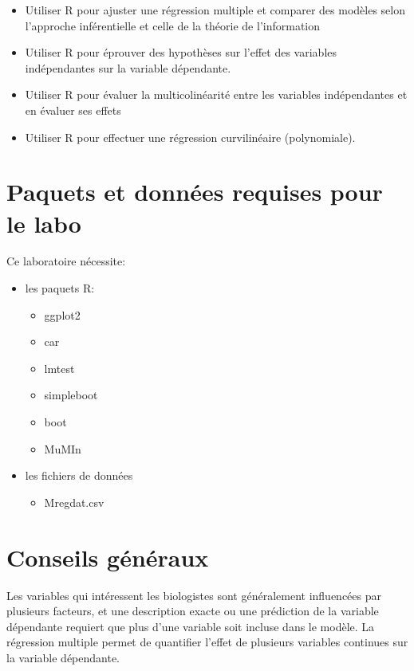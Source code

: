 \documentclass[
  12pt,
]{book}
\providecommand{\tightlist}{%
  \setlength{\itemsep}{0pt}\setlength{\parskip}{0pt}}
\begin{document}
\begin{itemize}
\tightlist
\item
  Utiliser R pour ajuster une régression multiple et comparer des modèles selon l'approche inférentielle et celle de la théorie de l'information
\item
  Utiliser R pour éprouver des hypothèses sur l'effet des variables indépendantes sur la variable dépendante.
\item
  Utiliser R pour évaluer la multicolinéarité entre les variables indépendantes et en évaluer ses effets
\item
  Utiliser R pour effectuer une régression curvilinéaire (polynomiale).
\end{itemize}

\hypertarget{set-reg-mul}{%
\section{Paquets et données requises pour le labo}\label{set-reg-mul}}

Ce laboratoire nécessite:

\begin{itemize}
\tightlist
\item
  les paquets R:

  \begin{itemize}
  \tightlist
  \item
    ggplot2
  \item
    car
  \item
    lmtest
  \item
    simpleboot
  \item
    boot
  \item
    MuMIn
  \end{itemize}
\item
  les fichiers de données

  \begin{itemize}
  \tightlist
  \item
    Mregdat.csv
  \end{itemize}
\end{itemize}

\hypertarget{conseils-guxe9nuxe9raux}{%
\section{Conseils généraux}\label{conseils-guxe9nuxe9raux}}

Les variables qui intéressent les biologistes sont généralement influencées par plusieurs facteurs, et une description exacte ou une prédiction de la variable dépendante requiert que plus d'une variable soit incluse dans le modèle. La régression multiple permet de quantifier l'effet de plusieurs variables continues sur la variable dépendante.
\end{document}
